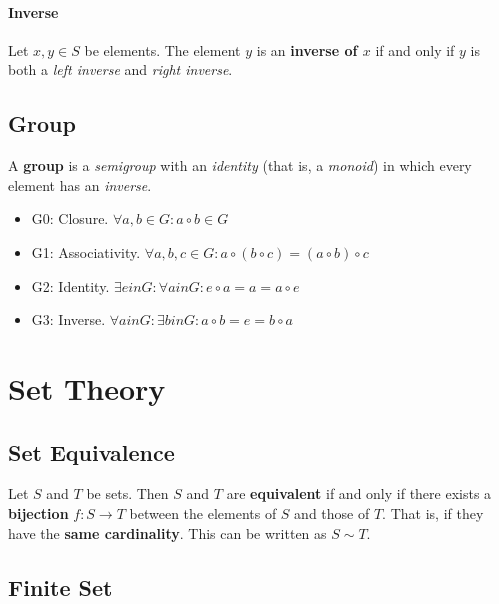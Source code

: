 \paragraph{Inverse}

Let $x , y \in S $ be elements. The element $y$ is an \textbf{inverse
  of $x$} if and only if $y$ is both a \textit{left inverse} and
\textit{right inverse}.


\subsection{Group}
\label{sec:group}

A \textbf{group} is a \textit{semigroup} with an \textit{identity}
(that is, a \textit{monoid}) in which every element has an
\textit{inverse}.

\begin{itemize}
\item G0: Closure. $ \forall a, b \in G: a \circ b \in G$
\item G1: Associativity. $ \forall a, b, c \in G: a \circ (b \circ c) = (a \circ b) \circ c $
\item G2: Identity. $\exists e in G : \forall a in G: e \circ a = a = a \circ e $
\item G3: Inverse. $\forall a in G: \exists b in G: a \circ b = e = b \circ a$
\end{itemize}

\newpage
\section{Set Theory}
\label{sec:set-theory}

\subsection{Set Equivalence}
\label{sec:set-eq}

Let $S$ and $T$ be sets. Then $S$ and $T$ are \textbf{equivalent} if
and only if there exists a \textbf{bijection} $f : S \to T$ between
the elements of $S$ and those of $T$. That is, if they have the
\textbf{same cardinality}. This can be written as $S \sim T$.


\subsection{Finite Set}
\label{sec:finite-set}

